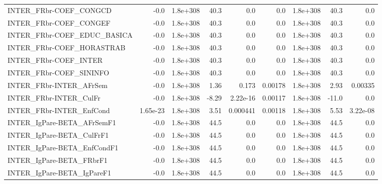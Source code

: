 \begin{tabular}{lrrrrrrrr}
INTER\_FRbr-COEF\_CONGCD               &        -0.0 &     1.8e+308 &    40.3 &      0.0 &        0.0 &    1.8e+308 &         40.3 &           0.0 \\
INTER\_FRbr-COEF\_CONGEF               &        -0.0 &     1.8e+308 &    40.3 &      0.0 &        0.0 &    1.8e+308 &         40.3 &           0.0 \\
INTER\_FRbr-COEF\_EDUC\_BASICA          &        -0.0 &     1.8e+308 &    40.3 &      0.0 &        0.0 &    1.8e+308 &         40.3 &           0.0 \\
INTER\_FRbr-COEF\_HORASTRAB            &        -0.0 &     1.8e+308 &    40.3 &      0.0 &        0.0 &    1.8e+308 &         40.3 &           0.0 \\
INTER\_FRbr-COEF\_INTER                &        -0.0 &     1.8e+308 &    40.3 &      0.0 &        0.0 &    1.8e+308 &         40.3 &           0.0 \\
INTER\_FRbr-COEF\_SININFO              &        -0.0 &     1.8e+308 &    40.3 &      0.0 &        0.0 &    1.8e+308 &         40.3 &           0.0 \\
INTER\_FRbr-INTER\_AFrSem              &        -0.0 &     1.8e+308 &    1.36 &    0.173 &    0.00178 &    1.8e+308 &         2.93 &       0.00335 \\
INTER\_FRbr-INTER\_CulFr               &        -0.0 &     1.8e+308 &   -8.29 & 2.22e-16 &    0.00117 &    1.8e+308 &        -11.0 &           0.0 \\
INTER\_FRbr-INTER\_EnfCond             &    1.65e-23 &     1.8e+308 &    3.51 & 0.000441 &    0.00118 &    1.8e+308 &         5.53 &      3.22e-08 \\
INTER\_IgPare-BETA\_AFrSemF1           &        -0.0 &     1.8e+308 &    44.5 &      0.0 &        0.0 &    1.8e+308 &         44.5 &           0.0 \\
INTER\_IgPare-BETA\_CulFrF1            &        -0.0 &     1.8e+308 &    44.5 &      0.0 &        0.0 &    1.8e+308 &         44.5 &           0.0 \\
INTER\_IgPare-BETA\_EnfCondF1          &        -0.0 &     1.8e+308 &    44.5 &      0.0 &        0.0 &    1.8e+308 &         44.5 &           0.0 \\
INTER\_IgPare-BETA\_FRbrF1             &        -0.0 &     1.8e+308 &    44.5 &      0.0 &        0.0 &    1.8e+308 &         44.5 &           0.0 \\
INTER\_IgPare-BETA\_IgPareF1           &        -0.0 &     1.8e+308 &    44.5 &      0.0 &        0.0 &    1.8e+308 &         44.5 &           0.0 \\

\end{tabular}
